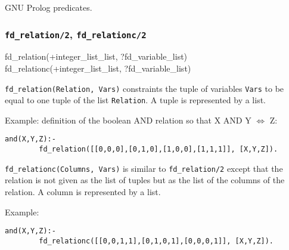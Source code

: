 \Portability

GNU Prolog predicates.

\subsubsection{\texttt{fd\_relation/2},
               \texttt{fd\_relationc/2}}

\begin{TemplatesOneCol}
fd\_relation(+integer\_list\_list, ?fd\_variable\_list)\\
fd\_relationc(+integer\_list\_list, ?fd\_variable\_list)

\end{TemplatesOneCol}

\Description

\texttt{fd\_relation(Relation, Vars)} constraints the tuple of variables
\texttt{Vars} to be equal to one tuple of the list \texttt{Relation}. A
tuple is represented by a list.

Example: definition of the boolean AND relation so that X AND Y
$\Leftrightarrow$ Z:

\begin{Indentation}
\begin{verbatim}
and(X,Y,Z):-
        fd_relation([[0,0,0],[0,1,0],[1,0,0],[1,1,1]], [X,Y,Z]).
\end{verbatim}
\end{Indentation}

\texttt{fd\_relationc(Columns, Vars)} is similar to \texttt{fd\_relation/2}
except that the relation is not given as the list of tuples but as the list
of the columns of the relation. A column is represented by a list.

Example:

\begin{Indentation}
\begin{verbatim}
and(X,Y,Z):-
        fd_relationc([[0,0,1,1],[0,1,0,1],[0,0,0,1]], [X,Y,Z]).
\end{verbatim}
\end{Indentation}

\begin{PlErrors}







\end{PlErrors}

